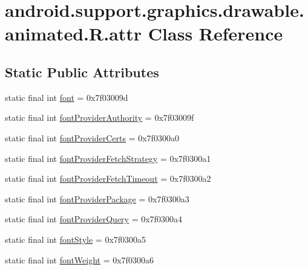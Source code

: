 \hypertarget{classandroid_1_1support_1_1graphics_1_1drawable_1_1animated_1_1R_1_1attr}{}\section{android.\+support.\+graphics.\+drawable.\+animated.\+R.\+attr Class Reference}
\label{classandroid_1_1support_1_1graphics_1_1drawable_1_1animated_1_1R_1_1attr}
\subsection*{Static Public Attributes}
\begin{DoxyCompactItemize}
\item 
static final int \mbox{\hyperlink{classandroid_1_1support_1_1graphics_1_1drawable_1_1animated_1_1R_1_1attr_a99643e2009ec47a9271f6768a14ddd2c}{font}} = 0x7f03009d
\item 
static final int \mbox{\hyperlink{classandroid_1_1support_1_1graphics_1_1drawable_1_1animated_1_1R_1_1attr_a0f49b981a4f1da3992f45f3dddcf75e6}{font\+Provider\+Authority}} = 0x7f03009f
\item 
static final int \mbox{\hyperlink{classandroid_1_1support_1_1graphics_1_1drawable_1_1animated_1_1R_1_1attr_aa2bd06656aa0be203dc5d1762a0aba5b}{font\+Provider\+Certs}} = 0x7f0300a0
\item 
static final int \mbox{\hyperlink{classandroid_1_1support_1_1graphics_1_1drawable_1_1animated_1_1R_1_1attr_a24355d3cf894fc917604f9f4f5ad7eba}{font\+Provider\+Fetch\+Strategy}} = 0x7f0300a1
\item 
static final int \mbox{\hyperlink{classandroid_1_1support_1_1graphics_1_1drawable_1_1animated_1_1R_1_1attr_a5f3c97df0c305c2ffe21fd56eb225179}{font\+Provider\+Fetch\+Timeout}} = 0x7f0300a2
\item 
static final int \mbox{\hyperlink{classandroid_1_1support_1_1graphics_1_1drawable_1_1animated_1_1R_1_1attr_a01be735f06dd63dca7f73e660f227080}{font\+Provider\+Package}} = 0x7f0300a3
\item 
static final int \mbox{\hyperlink{classandroid_1_1support_1_1graphics_1_1drawable_1_1animated_1_1R_1_1attr_a141e0e2796b6865a43d75420d4a7d625}{font\+Provider\+Query}} = 0x7f0300a4
\item 
static final int \mbox{\hyperlink{classandroid_1_1support_1_1graphics_1_1drawable_1_1animated_1_1R_1_1attr_a5f7863687d4567c9c41800c81fa08275}{font\+Style}} = 0x7f0300a5
\item 
static final int \mbox{\hyperlink{classandroid_1_1support_1_1graphics_1_1drawable_1_1animated_1_1R_1_1attr_acf77cf00a4ce91f975f11783754189c1}{font\+Weight}} = 0x7f0300a6
\end{DoxyCompactItemize}


